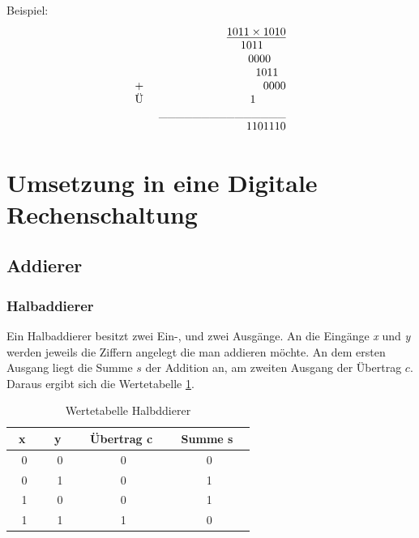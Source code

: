 \documentclass[a4paper,12pt,fleqn,oneside]{article}
\begin{document}
		Beispiel:
			\[ \begin{array}{lrcll}
   					&		 	       	\uline{1 0 1 1 \times 1 0 1 0}   	 				\\
  			       		&   			            1 0 1 1 $ $$ $$ $$ $$ $$ $        	 			\\
					&   			            0 0 0 0 $ $$ $$ $$ $        	 				\\
					&   			            1 0 1 1 $ $$ $        	 					\\
				$+ $	&   			            0 0 0 0			        	 				\\
				$Ü $	&			      	    1 $ $$ $$ $$ $$ $$ $$ $$ $					\\
					&	\_\_\_\_\_\_\_\_\_\_\_\_\_\_\_						\\
					&				    1101110
			\end{array} \]



\newpage

	\section{Umsetzung in eine Digitale Rechenschaltung}
	\subsection{Addierer}
		\subsubsection{Halbaddierer}
		Ein Halbaddierer besitzt zwei Ein-, und zwei Ausgänge. An die Eingänge \emph{x} und \emph{y} werden jeweils die Ziffern
		angelegt die man addieren möchte. An dem ersten Ausgang liegt die Summe $s$ der Addition an, am zweiten Ausgang der Übertrag $c$.\\
		Daraus ergibt sich die Wertetabelle \ref{tab:halbaddierer}.
		\begin{table}[h]
			\center
			\begin{tabular}{c|c|c|c}
				\ \textbf{x} \ 	& \ \textbf{y} \ 	& \ \textbf{Übertrag c} \ & \ \textbf{Summe s} \ 	 	\\ \hline
				0 	& 0 		& 0          		& 0       			\\ \hline
				0 	& 1 		& 0          		& 1       			\\ \hline
				1 	& 0		& 0          		& 1      			 \\ \hline
				1	& 1 		& 1          		& 0      			 \\
			\end{tabular}
			\caption{Wertetabelle Halbddierer}
			\label{tab:halbaddierer}
		\end{table}
\end{document}
